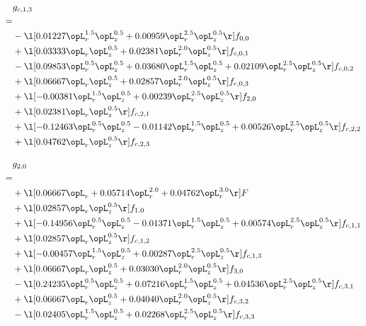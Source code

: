 \begin{alignat}{2} 
\label{eq:g_13_0} 
& g_{c,1,3} \nonumber \\ 
 = \\ 
& - \l[  0.01227 \opL_r^{1.5} \opL_z^{0.5} +  0.00959 \opL_r^{2.5} \opL_z^{0.5}  \r] f_{0,0} \nonumber \\ 
& + \l[  0.03333 \opL_r \opL_z^{0.5} +  0.02381 \opL_r^{2.0} \opL_z^{0.5}  \r] f_{c,0,1} \nonumber \\ 
& - \l[  0.09853 \opL_r^{0.5} \opL_z^{0.5} +  0.03680 \opL_r^{1.5} \opL_z^{0.5} +  0.02109 \opL_r^{2.5} \opL_z^{0.5}  \r] f_{c,0,2} \nonumber \\ 
& + \l[  0.06667 \opL_r \opL_z^{0.5} +  0.02857 \opL_r^{2.0} \opL_z^{0.5}  \r] f_{c,0,3} \nonumber \\ 
& + \l[  -0.00381 \opL_r^{1.5} \opL_z^{0.5} +  0.00239 \opL_r^{2.5} \opL_z^{0.5}  \r] f_{2,0} \nonumber \\ 
& + \l[  0.02381 \opL_r \opL_z^{0.5}  \r] f_{c,2,1} \nonumber \\ 
& + \l[  -0.12463 \opL_r^{0.5} \opL_z^{0.5}   -0.01142 \opL_r^{1.5} \opL_z^{0.5} +  0.00526 \opL_r^{2.5} \opL_z^{0.5}  \r] f_{c,2,2} \nonumber \\ 
& + \l[  0.04762 \opL_r \opL_z^{0.5}  \r] f_{c,2,3} \nonumber \\ 
\end{alignat} 


\begin{alignat}{2} 
\label{eq:g_20_0} 
& g_{2,0} \nonumber \\ 
 = \\ 
& + \l[  0.06667 \opL_r +  0.05714 \opL_r^{2.0} +  0.04762 \opL_r^{3.0}  \r] F \nonumber \\ 
& + \l[  0.02857 \opL_r \opL_z^{0.5}  \r] f_{1,0} \nonumber \\ 
& + \l[  -0.14956 \opL_r^{0.5} \opL_z^{0.5}   -0.01371 \opL_r^{1.5} \opL_z^{0.5} +  0.00574 \opL_r^{2.5} \opL_z^{0.5}  \r] f_{c,1,1} \nonumber \\ 
& + \l[  0.02857 \opL_r \opL_z^{0.5}  \r] f_{c,1,2} \nonumber \\ 
& + \l[  -0.00457 \opL_r^{1.5} \opL_z^{0.5} +  0.00287 \opL_r^{2.5} \opL_z^{0.5}  \r] f_{c,1,3} \nonumber \\ 
& + \l[  0.06667 \opL_r \opL_z^{0.5} +  0.03030 \opL_r^{2.0} \opL_z^{0.5}  \r] f_{3,0} \nonumber \\ 
& - \l[  0.24235 \opL_r^{0.5} \opL_z^{0.5} +  0.07216 \opL_r^{1.5} \opL_z^{0.5} +  0.04536 \opL_r^{2.5} \opL_z^{0.5}  \r] f_{c,3,1} \nonumber \\ 
& + \l[  0.06667 \opL_r \opL_z^{0.5} +  0.04040 \opL_r^{2.0} \opL_z^{0.5}  \r] f_{c,3,2} \nonumber \\ 
& - \l[  0.02405 \opL_r^{1.5} \opL_z^{0.5} +  0.02268 \opL_r^{2.5} \opL_z^{0.5}  \r] f_{c,3,3} \nonumber \\ 
\end{alignat} 


